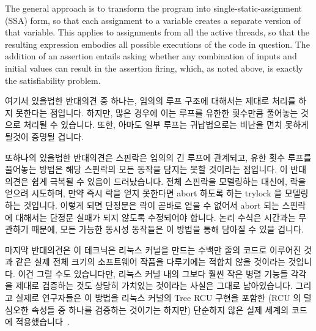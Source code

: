 The general approach is to transform the program into single-static-assignment
(SSA) form, so that each assignment to a variable creates a separate
version of that variable.
This applies to assignments from all the active threads, so that the
resulting expression embodies all possible executions of the code
in question.
The addition of an assertion entails asking whether any combination of
inputs and initial values can result in the assertion firing, which,
as noted above, is exactly the satisfiability problem.
\fi

여기서 있을법한 반대의견 중 하나는, 임의의 루프 구조에 대해서는 제대로 처리를
하지 못한다는 점입니다.
하지만, 많은 경우에 이는 루프를 유한한 횟수만큼 풀어놓는 것으로 처리될 수
있습니다.
또한, 아마도 일부 루프는 귀납법으로는 비난을 면치 못하게 될것이 증명될 겁니다.
\iffalse

One possible objection is that it does not gracefully handle arbitrary
looping constructs.
However, in many cases, this can be handled by unrolling the loop a
finite number of times.
In addition, perhaps some loops will also prove amenable to collapse
via inductive methods.
\fi

또하나의 있을법한 반대의견은 스핀락은 임의의 긴 루프에 관계되고, 유한 횟수
루프를 풀어놓는 방법은 해당 스핀락의 모든 동작을 담지는 못할 것이라는 점입니다.
이 반대의견은 쉽게 극복될 수 있음이 드러났습니다.
전체 스핀락을 모델링하는 대신에, 락을 얻으려 시도하며, 만약 즉시 락을 얻지
못한다면 abort 하도록 하는 trylock 을 모델링 하는 것입니다.
이렇게 되면 단정문은 락이 곧바로 얻을 수 없어서 abort 되는 스핀락에 대해서는
단정문 실패가 되지 않도록 수정되어야 합니다.
논리 수식은 시간과는 무관하기 때문에, 모든 가능한 동시성 동작들은 이 방법을
통해 담아질 수 있을 겁니다.
\iffalse

Another possible objection is that spinlocks involve arbitrarily long
loops, and any finite unrolling would fail to capture the full behavior
of the spinlock.
It turns out that this objection is easily overcome.
Instead of modeling a full spinlock, model a trylock that attempts to
obtain the lock, and aborts if it fails to immediately do so.
The assertion must then be crafted so as to avoid firing in cases
where a spinlock aborted due to the lock not being immediately available.
Because the logic expression is independent of time, all possible
concurrency behaviors will be captured via this approach.
\fi

마지막 반대의견은 이 테크닉은 리눅스 커널을 만드는 수백만 줄의 코드로 이루어진
것과 같은 실제 전체 크기의 소프트웨어 작품을 다루기에는 적합치 않을 것이라는
것입니다.
이건 그럴 수도 있습니다만, 리눅스 커널 내의 그보다 훨씬 작은 병렬 기능들 각각을
제대로 검증하는 것도 상당히 가치있는 것이라는 사실은 그대로 남아있습니다.
그리고 실제로 연구자들은 이 방법을 리눅스 커널의 Tree RCU 구현을 포함한 (RCU 의
덜 심오한 속성들 중 하나를 검증하는 것이기는 하지만) 단순하지 않은 실제 세계의
코드에
적용했습니다~\cite{LihaoLiang2016VerifyTreeRCU,MichalisKokologiannakis2017NidhuggRCU}.

